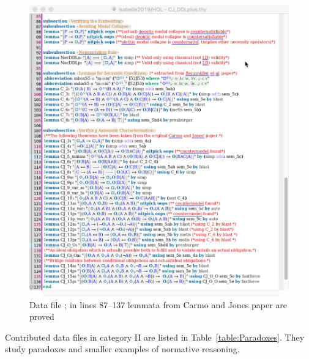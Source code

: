 \documentclass{article}
\begin{document}
\begin{figure}[ht!]
 \includegraphics[width=\textwidth]{CJ_DDLplus2.png}
\caption{Data file \textsf{\small {}; in
    lines 87--137 lemmata from Carmo and Jones paper \cite{CJ13} are
    proved \label{fig:CJ_DDLplus2}}}
\end{figure}

Contributed data files in category II are listed in
Table~\ref{table:Paradoxes}. They study paradoxes and smaller examples of normative reasoning.



\end{document}
